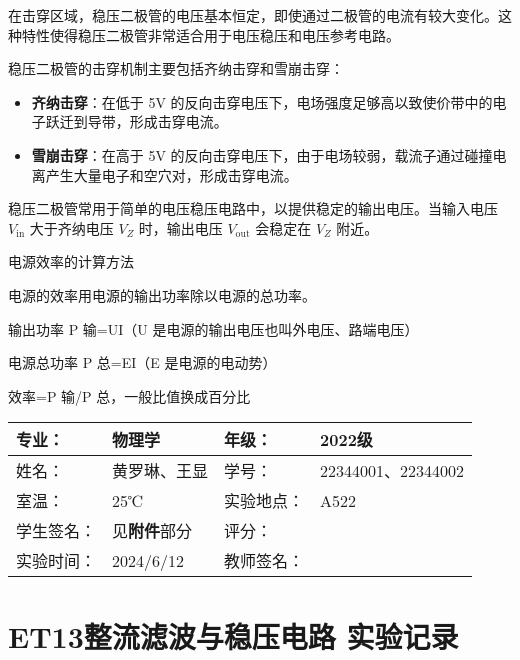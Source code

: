 \documentclass[dvipsnames, svgnames,a4paper,11pt]{article}
\begin{document}
在击穿区域，稳压二极管的电压基本恒定，即使通过二极管的电流有较大变化。这种特性使得稳压二极管非常适合用于电压稳压和电压参考电路。

稳压二极管的击穿机制主要包括齐纳击穿和雪崩击穿：

\begin{itemize}
    \item \textbf{齐纳击穿}：在低于 5V 的反向击穿电压下，电场强度足够高以致使价带中的电子跃迁到导带，形成击穿电流。
    \item \textbf{雪崩击穿}：在高于 5V 的反向击穿电压下，由于电场较弱，载流子通过碰撞电离产生大量电子和空穴对，形成击穿电流。
\end{itemize}

稳压二极管常用于简单的电压稳压电路中，以提供稳定的输出电压。当输入电压 $V_\text{in}$ 大于齐纳电压 $V_Z$ 时，输出电压 $V_\text{out}$ 会稳定在 $V_Z$ 附近。

	\begin{question}
		电源效率的计算方法
	\end{question}
电源的效率用电源的输出功率除以电源的总功率。

输出功率 P 输=UI（U 是电源的输出电压也叫外电压、路端电压）

电源总功率 P 总=EI（E 是电源的电动势）

效率=P 输/P 总，一般比值换成百分比
	
	
	
	\clearpage
	
	\begin{table}
		\renewcommand\arraystretch{1.7}
		\centering
		\begin{tabularx}{\textwidth}{|X|X|X|X|}
			\hline
			专业： & 物理学 & 年级： & 2022级 \\
			\hline
			姓名： &黄罗琳、王显  & 学号： &22344001、22344002 \\
			\hline
			室温： & 25℃ & 实验地点： & A522 \\
			\hline
			学生签名：& 见\textbf{附件}部分 & 评分： &\\
			\hline
			实验时间：& 2024/6/12 & 教师签名：&\\
			\hline
		\end{tabularx}
	\end{table}
	
	\section{ET13整流滤波与稳压电路  \quad\heiti 实验记录}
	
\end{document}
